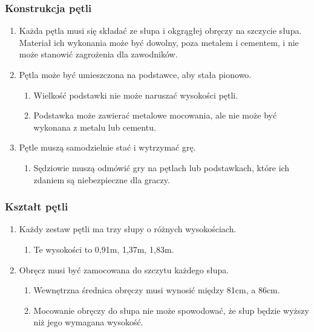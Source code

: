 \documentclass[11pt,a4paper]{article}
\begin{document}
\subsubsection{Konstrukcja pętli}
\begin{enumerate}
  \item Każda pętla musi się składać ze słupa i okgrągłej obręczy na szczycie słupa. Materiał ich wykonania może być dowolny, poza metalem i cementem, i nie może stanowić zagrożenia dla zawodników.
  \item Pętla może być umieszczona na podstawce, aby stała pionowo.
  \begin{enumerate}
    \item Wielkość podstawki nie może naruszać wysokości pętli.
    \item Podstawka może zawierać metalowe mocowania, ale nie może być wykonana z metalu lub cementu.
  \end{enumerate}
  \item Pętle muszą samodzielnie stać i wytrzymać grę.
  \begin{enumerate}
    \item Sędziowie muszą odmówić gry na pętlach lub podstawkach, które ich zdaniem są niebezpieczne dla graczy.
  \end{enumerate}
\end{enumerate}

\subsubsection{Kształt pętli}
\begin{enumerate}
  \item Każdy zestaw pętli ma trzy słupy o różnych wysokościach.
  \begin{enumerate}
    \item Te wysokości to 0,91m, 1,37m, 1,83m.
  \end{enumerate}
  \item Obręcz musi być zamocowana do szczytu każdego słupa.
  \begin{enumerate}
    \item Wewnętrzna średnica obręczy musi wynosić między 81cm, a 86cm.
    \item Mocowanie obręczy do słupa nie może spowodować, że słup będzie wyższy niż jego wymagana wysokość.
  \end{enumerate}
\end{enumerate}
\end{document}
